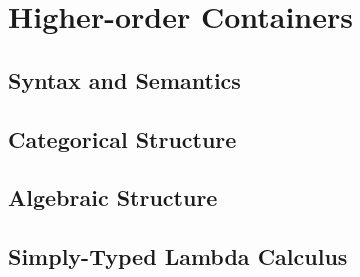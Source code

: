 \section{Higher-order Containers}

\subsection{Syntax and Semantics}

\subsection{Categorical Structure}

\subsection{Algebraic Structure}

\subsection{Simply-Typed Lambda Calculus}